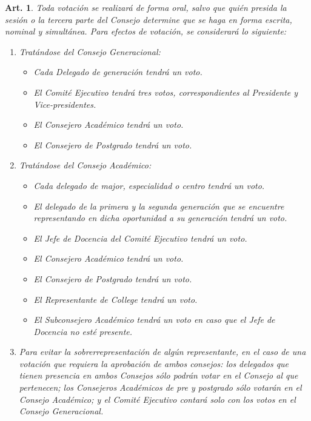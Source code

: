 \documentclass[letterpaper,11pt]{article}
\theoremstyle{plain}
\newtheorem{art}{Art.} %
\begin{document}
			\begin{art}\label{votacioncesConsejo}
				Toda votación se realizará de forma oral, salvo que quién presida la sesión o la tercera parte del Consejo determine que se haga en forma escrita, nominal y simultánea. Para efectos de votación, se considerará lo siguiente:
				\begin{enumerate}
					\item Tratándose del Consejo Generacional:
						\begin{itemize}
							\item Cada Delegado de generación tendrá un voto.
							\item El Comité Ejecutivo tendrá tres votos, correspondientes al Presidente y Vice-presidentes.
							\item El Consejero Académico tendrá un voto.
							\item El Consejero de Postgrado tendrá un voto.
						\end{itemize}
					\item Tratándose del Consejo Académico:
						\begin{itemize}
							\item Cada delegado de major, especialidad o centro tendrá un voto.
							\item El delegado de la primera y la segunda generación que se encuentre representando en dicha oportunidad a su generación tendrá un voto.
							\item El Jefe de Docencia del Comité Ejecutivo tendrá un voto.
							\item El Consejero Académico tendrá un voto.
							\item El Consejero de Postgrado tendrá un voto.
							\item El Representante de College tendrá un voto.
							\item El Subconsejero Académico tendrá un voto en caso que el Jefe de Docencia no esté presente.
						\end{itemize}
					\item Para evitar la sobrerrepresentación de algún representante, en el caso de una votación que requiera la aprobación de ambos consejos: los delegados que tienen presencia en ambos Consejos sólo podrán votar en el Consejo al que pertenecen; los Consejeros Académicos de pre y postgrado sólo votarán en el Consejo Académico; y el Comité Ejecutivo contará solo con los votos en el Consejo Generacional.
				\end{enumerate}
			\end{art}
\end{document}
